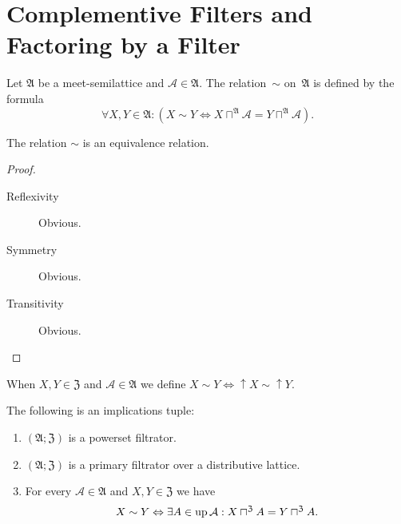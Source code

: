 \section{Complementive Filters and Factoring by a Filter}
\begin{defn}
Let $\mathfrak{A}$ be a meet-semilattice and $\mathcal{A}\in\mathfrak{A}$.
The relation~$\sim$ on~$\mathfrak{A}$ is defined by the formula
\[
\forall X,Y\in\mathfrak{A:}(X\sim Y\Leftrightarrow X\sqcap^{\mathfrak{A}}\mathcal{A}=Y\sqcap^{\mathfrak{A}}\mathcal{A}).
\]
\end{defn}
\begin{prop}
The relation $\sim$ is an equivalence relation.\end{prop}
\begin{proof}
~
\begin{description}
\item [{Reflexivity}] Obvious.
\item [{Symmetry}] Obvious.
\item [{Transitivity}] Obvious.
\end{description}
\end{proof}
\begin{defn}
When $X,Y\in\mathfrak{Z}$ and $\mathcal{A}\in\mathfrak{A}$ we define
$X\sim Y\Leftrightarrow\uparrow X\sim\uparrow Y$.\end{defn}
\begin{thm}
\label{eqrel-princ}The following is an implications tuple:
\begin{enumerate}
\item \label{eqrel-princ-p}$(\mathfrak{A};\mathfrak{Z})$ is a powerset
filtrator.
\item \label{eqrel-princ-fltr}$(\mathfrak{A};\mathfrak{Z})$ is a primary
filtrator over a distributive lattice.
\item \label{eqrel-princ-conc}For every $\mathcal{A}\in\mathfrak{A}$ and
$X,Y\in\mathfrak{Z}$ we have
\[
X\sim Y\Leftrightarrow\exists A\in\operatorname{up}\mathcal{A}:X\sqcap^{\mathfrak{Z}}A=Y\sqcap^{\mathfrak{Z}}A.
\]

\end{enumerate}
\end{thm}
